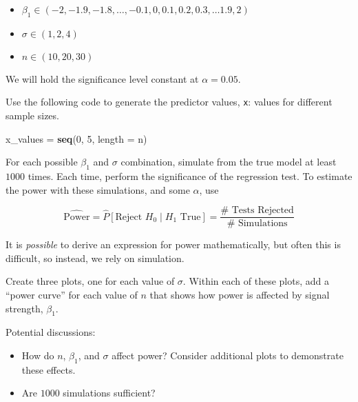 \documentclass[
]{article}
\newenvironment{Shaded}{\begin{snugshade}}{\end{snugshade}}
\newcommand{\DataTypeTok}[1]{\textcolor[rgb]{0.13,0.29,0.53}{#1}}
\newcommand{\DecValTok}[1]{\textcolor[rgb]{0.00,0.00,0.81}{#1}}
\newcommand{\KeywordTok}[1]{\textcolor[rgb]{0.13,0.29,0.53}{\textbf{#1}}}
\newcommand{\NormalTok}[1]{#1}
\newcommand{\StringTok}[1]{\textcolor[rgb]{0.31,0.60,0.02}{#1}}
\providecommand{\tightlist}{%
  \setlength{\itemsep}{0pt}\setlength{\parskip}{0pt}}
\begin{document}
\begin{itemize}
\tightlist
\item
  \(\beta_1 \in (-2, -1.9, -1.8, \ldots, -0.1, 0, 0.1, 0.2, 0.3, \ldots 1.9, 2)\)
\item
  \(\sigma \in (1, 2, 4)\)
\item
  \(n \in (10, 20, 30)\)
\end{itemize}

We will hold the significance level constant at \(\alpha = 0.05\).

Use the following code to generate the predictor values, \texttt{x}:
values for different sample sizes.

\begin{Shaded}
\begin{Highlighting}[]
\NormalTok{x_values =}\StringTok{ }\KeywordTok{seq}\NormalTok{(}\DecValTok{0}\NormalTok{, }\DecValTok{5}\NormalTok{, }\DataTypeTok{length =}\NormalTok{ n)}
\end{Highlighting}
\end{Shaded}

For each possible \(\beta_1\) and \(\sigma\) combination, simulate from
the true model at least \(1000\) times. Each time, perform the
significance of the regression test. To estimate the power with these
simulations, and some \(\alpha\), use

\[
\hat{\text{Power}} = \hat{P}[\text{Reject } H_0 \mid H_1 \text{ True}] = \frac{\text{# Tests Rejected}}{\text{# Simulations}}
\]

It is \emph{possible} to derive an expression for power mathematically,
but often this is difficult, so instead, we rely on simulation.

Create three plots, one for each value of \(\sigma\). Within each of
these plots, add a ``power curve'' for each value of \(n\) that shows
how power is affected by signal strength, \(\beta_1\).

Potential discussions:

\begin{itemize}
\tightlist
\item
  How do \(n\), \(\beta_1\), and \(\sigma\) affect power? Consider
  additional plots to demonstrate these effects.
\item
  Are \(1000\) simulations sufficient?
\end{itemize}
\end{document}
